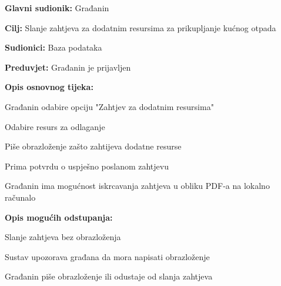 				\noindent {}
				\begin{packed_item}
					
					\item \textbf{Glavni sudionik: }Građanin
					\item  \textbf{Cilj:} Slanje zahtjeva za dodatnim resursima za prikupljanje kućnog otpada
					\item  \textbf{Sudionici:} Baza podataka
					\item  \textbf{Preduvjet:} Građanin je prijavljen
					\item  \textbf{Opis osnovnog tijeka:}
					
					\item[] \begin{packed_enum}
						\item Građanin odabire opciju "Zahtjev za dodatnim resursima"
						\item Odabire resurs za odlaganje
						\item Piše obrazloženje zašto zahtijeva dodatne resurse
						\item Prima potvrdu o uspješno poslanom zahtjevu
						\item Građanin ima mogućnost iskrcavanja zahtjeva u obliku PDF-a na lokalno računalo
					\end{packed_enum}
					
					\item  \textbf{Opis mogućih odstupanja:}
					
					\item[] \begin{packed_item}
						
						\item[2.a] Slanje zahtjeva bez obrazloženja
						\item[] \begin{packed_enum}
							
							\item Sustav upozorava građana da mora napisati obrazloženje
							\item Građanin piše obrazloženje ili odustaje od slanja zahtjeva
							
						\end{packed_enum}
						
						
					\end{packed_item}
				\end{packed_item}
				
